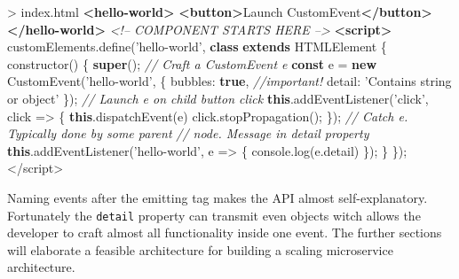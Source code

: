 \documentclass[]{assets/latex/ieee}
\newenvironment{Shaded}{}{}
\newcommand{\KeywordTok}[1]{\textcolor[rgb]{0.00,0.44,0.13}{\textbf{{#1}}}}
\newcommand{\DataTypeTok}[1]{\textcolor[rgb]{0.56,0.13,0.00}{{#1}}}
\newcommand{\StringTok}[1]{\textcolor[rgb]{0.25,0.44,0.63}{{#1}}}
\newcommand{\SpecialStringTok}[1]{\textcolor[rgb]{0.73,0.40,0.53}{{#1}}}
\newcommand{\CommentTok}[1]{\textcolor[rgb]{0.38,0.63,0.69}{\textit{{#1}}}}
\newcommand{\VariableTok}[1]{\textcolor[rgb]{0.10,0.09,0.49}{{#1}}}
\newcommand{\OperatorTok}[1]{\textcolor[rgb]{0.40,0.40,0.40}{{#1}}}
\newcommand{\AttributeTok}[1]{\textcolor[rgb]{0.49,0.56,0.16}{{#1}}}
\newcommand{\NormalTok}[1]{{#1}}
\begin{document}
\begin{Shaded}
\begin{Highlighting}[]
\NormalTok{> index.html}
\KeywordTok{<hello-world>}
 \KeywordTok{<button>}\NormalTok{Launch CustomEvent}\KeywordTok{</button>}
\KeywordTok{</hello-world>}
\CommentTok{<!-- COMPONENT STARTS HERE -->}
\KeywordTok{<script>}
 \VariableTok{customElements}\NormalTok{.}\AttributeTok{define}\NormalTok{(}\StringTok{'hello-world'}\OperatorTok{,} 
 \KeywordTok{class} \KeywordTok{extends} \NormalTok{HTMLElement }\OperatorTok{\{}
  \AttributeTok{constructor}\NormalTok{() }\OperatorTok{\{}
     \KeywordTok{super}\NormalTok{()}\OperatorTok{;}
   \CommentTok{// Craft a CustomEvent e}
     \KeywordTok{const} \NormalTok{e }\OperatorTok{=} \KeywordTok{new} \AttributeTok{CustomEvent}\NormalTok{(}\StringTok{'hello-world'}\OperatorTok{,} \OperatorTok{\{}
    \DataTypeTok{bubbles}\OperatorTok{:} \KeywordTok{true}\OperatorTok{,} \CommentTok{//important!}
    \DataTypeTok{detail}\OperatorTok{:} \StringTok{'Contains string or object'}
   \OperatorTok{\}}\NormalTok{)}\OperatorTok{;}
   \CommentTok{// Launch e on child button click}
   \KeywordTok{this}\NormalTok{.}\AttributeTok{addEventListener}\NormalTok{(}\StringTok{'click'}\OperatorTok{,} \NormalTok{click }\OperatorTok{=>} \OperatorTok{\{}
    \KeywordTok{this}\NormalTok{.}\AttributeTok{dispatchEvent}\NormalTok{(e)}
    \VariableTok{click}\NormalTok{.}\AttributeTok{stopPropagation}\NormalTok{()}\OperatorTok{;}
   \OperatorTok{\}}\NormalTok{)}\OperatorTok{;}
   \CommentTok{// Catch e. Typically done by some parent}
     \CommentTok{// node. Message in detail property}
   \KeywordTok{this}\NormalTok{.}\AttributeTok{addEventListener}\NormalTok{(}\StringTok{'hello-world'}\OperatorTok{,} \NormalTok{e }\OperatorTok{=>} \OperatorTok{\{}
    \VariableTok{console}\NormalTok{.}\AttributeTok{log}\NormalTok{(}\VariableTok{e}\NormalTok{.}\AttributeTok{detail}\NormalTok{)}
   \OperatorTok{\}}\NormalTok{)}\OperatorTok{;}
  \OperatorTok{\}}
 \OperatorTok{\}}\NormalTok{)}\OperatorTok{;}
\OperatorTok{<}\SpecialStringTok{/script>}
\end{Highlighting}
\end{Shaded}

Naming events after the emitting tag makes the API almost
self-explanatory. Fortunately the \texttt{detail} property can transmit
even objects witch allows the developer to craft almost all
functionality inside one event. The further sections will elaborate a
feasible architecture for building a scaling microservice architecture.
\end{document}
